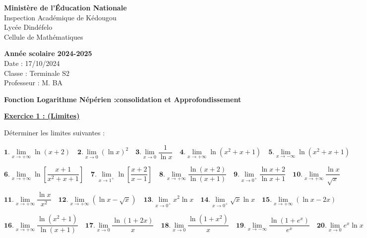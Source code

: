 \documentclass[12pt]{article}
\begin{document}
\noindent
\begin{minipage}[t]{0.48\textwidth}
\raggedright
\textbf{Ministère de l'Éducation Nationale}\\
Inspection Académique de Kédougou\\
Lycée Dindéfelo\\
Cellule de Mathématiques
\end{minipage}
\hfill
\begin{minipage}[t]{0.48\textwidth}
\raggedleft
\textbf{Année scolaire 2024-2025}\\
Date : 17/10/2024\\
Classe : Terminale S2\\
Professeur : M. BA
\end{minipage}
\vspace{0.5cm}
\begin{center}
\textbf{Fonction Logarithme Népérien :consolidation et Approfondissement}
\end{center}
\vspace{0.5cm}
\begin{center}
\underline{\textbf{Exercice 1 : (Limites)}}
\end{center}
Déterminer les limites suivantes :

\[
\textbf{1.} \lim_{x \to +\infty} \ln(x+2) \quad 
\textbf{2.} \lim_{x \to 0} (\ln x)^2 \quad 
\textbf{3.} \lim_{x \to 0} \frac{1}{\ln x} \quad 
\textbf{4.} \lim_{x \to +\infty} \ln(x^2 + x + 1) \quad 
\textbf{5.} \lim_{x \to -\infty} \ln(x^2 + x + 1)
\]

\[
\textbf{6.} \lim\limits_{x \to +\infty} \ln\left[ \frac{x+1}{x^2 + x + 1}\right]  \quad 
\textbf{7.} \lim\limits_{x \to 1^+} \ln\left[ \frac{x+2}{x-1}\right]  \quad 
\textbf{8.} \lim\limits_{x \to +\infty} \frac{\ln(x+2)}{\ln(x+1)} \quad 
\textbf{9.} \lim\limits_{x \to 0^+} \frac{\ln x+2}{\ln x+1} \quad
\textbf{10.} \lim\limits_{x \to +\infty} \frac{\ln x}{\sqrt{x}}
\]

\[ 
\textbf{11.} \lim\limits_{x \to +\infty} \frac{\ln x}{x^2} \quad
\textbf{12.} \lim\limits_{x \to +\infty} (\ln x - \sqrt{x}) \quad
\textbf{13.} \lim\limits_{x \to 0^+} x^2 \ln x \quad
\textbf{14.} \lim\limits_{x \to 0^+} \sqrt{x} \ln x \quad
\textbf{15.} \lim\limits_{x \to +\infty} (\ln x - 2x)
\]

\[ 
\textbf{16.} \lim\limits_{x \to +\infty} \frac{\ln(x^2 + 1)}{\ln(x+1)} \quad 
\textbf{17.} \lim\limits_{x \to 0} \frac{\ln(1 + 2x)}{x} \quad 
\textbf{18.} \lim\limits_{x \to 0} \frac{\ln(1 + x^2)}{x} \quad
\textbf{19.} \lim\limits_{x \to -\infty} \frac{\ln(1 + e^x)}{e^x} \quad
\textbf{20.} \lim\limits_{x \to 0} e^x \ln x
\]
\end{document}

